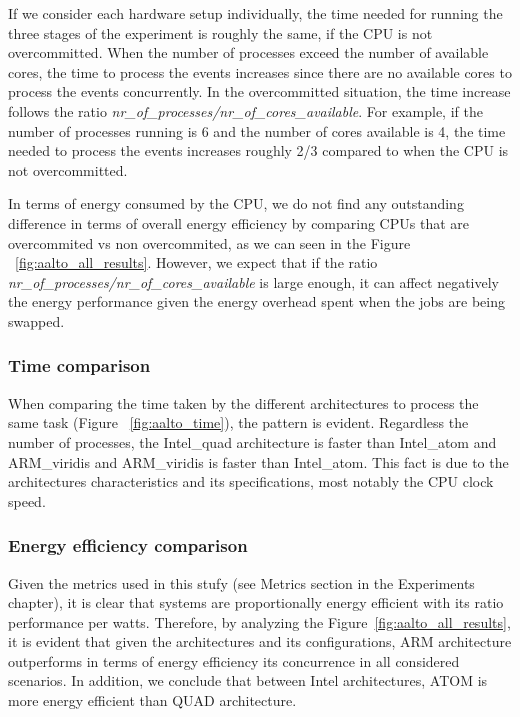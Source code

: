 If we consider each hardware setup individually, the time needed for running the three stages of the experiment is roughly the same, if the CPU is not overcommitted. When
the number of processes exceed the number of available cores, the time to 
process the events increases since there are no available cores to process the
events concurrently. In the overcommitted situation, the time increase follows
the ratio \textit{nr\_of\_processes/nr\_of\_cores\_available}. 
For example, if the
number of processes running is 6 and the number of cores available is 4, the
time needed to process the events increases roughly 2/3 compared to when the
CPU is not overcommitted.

In terms of energy consumed by the CPU, we do not find any outstanding difference in terms of overall energy efficiency by comparing CPUs that are overcommited vs non overcommited, as we can seen in the Figure ~\ref{fig:aalto_all_results}. However, we expect that if the ratio \textit{nr\_of\_processes/nr\_of\_cores\_available} is large enough, it can affect negatively the energy performance given the energy overhead spent when the jobs are being swapped.


\subsubsection*{Time comparison}
When comparing the time taken by the different architectures to process the same
task (Figure ~\ref{fig:aalto_time}), the pattern is evident. 
Regardless the number of processes, the 
Intel\_quad architecture is faster than Intel\_atom and ARM\_viridis and ARM\_viridis is faster than Intel\_atom.
This fact is due to the architectures characteristics and its specifications, most notably the CPU clock speed.\\


\subsubsection*{Energy efficiency comparison}
Given the metrics used in this stufy (see Metrics section in the Experiments chapter), it is clear that  
systems are  proportionally energy efficient with its ratio performance per 
watts. Therefore, by analyzing the Figure~\ref{fig:aalto_all_results}, it is evident that given the architectures and its configurations, ARM architecture outperforms in terms of energy efficiency its concurrence in all considered 
scenarios. In addition, we conclude that between Intel architectures, ATOM is more energy efficient than QUAD architecture. 


